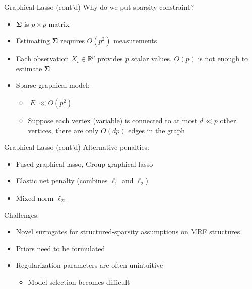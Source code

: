 \documentclass{beamer}
\begin{document}
\begin{frame}{Graphical Lasso (cont'd)}
  Why do we put sparsity constraint?
  \begin{itemize}
  \item $\mathbf{\Sigma}$ is $p \times p$ matrix
  \item Estimating $\mathbf{\Sigma}$ requires $O(p^2)$ measurements
  \item Each observation $X_i \in \mathbb{R}^p$ provides $p$ scalar
    values. $O(p)$ is not enough to estimate $\mathbf{\Sigma}$
  \item Sparse graphical model:
    \begin{itemize}
    \item $|E| \ll O(p^2)$
    \item Suppose each vertex (variable) is connected to at most $d
      \ll p$ other vertices, there are only $O(dp)$ edges in the graph
    \end{itemize}
  \end{itemize}
\end{frame}
\begin{frame}{Graphical Lasso (cont'd)}
  Alternative penalties:
  \begin{itemize}
    \item Fused graphical lasso, Group graphical lasso
      \citep{danaher2014joint}
    \item Elastic net penalty (combines $\ell_1$ and $\ell_2$)
      \citep{ryali2012estimation}
    \item Mixed norm $\ell_{21}$ \citep{varoquaux2010brain}
  \end{itemize}
  Challenges:
  \begin{itemize}
    \item Novel surrogates for structured-sparsity assumptions on MRF
      structures
    \item Priors need to be formulated
    \item Regularization parameters are often unintuitive
      \begin{itemize}
        \item Model selection becomes difficult
      \end{itemize}
  \end{itemize}
\end{frame}
\end{document}
